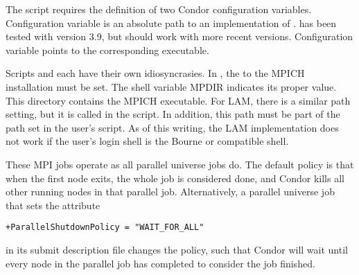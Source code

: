 The  script requires the definition of
two Condor configuration variables.
Configuration variable  is an absolute path to
an implementation of .
 has been tested with  version 3.9,
but should work with more recent versions.
Configuration variable  points
to the corresponding  executable.

Scripts  and 
each have their own idiosyncrasies.
In , the  to the MPICH installation must be set.
The shell variable MPDIR indicates its proper value.
This directory contains the MPICH  executable.
For LAM, there is a similar path setting, but it is called 
in the  script.  In addition, this path must be part of the
path set in the user's  script.
As of this writing, the LAM implementation does not work
if the user's login shell is the Bourne or compatible shell.

These MPI jobs operate as all parallel universe jobs do.
The default policy is that when the first node exits,
the whole job is considered done, 
and Condor kills all other running nodes in that parallel job.
Alternatively, a parallel universe job that sets the attribute
\begin{verbatim}
+ParallelShutdownPolicy = "WAIT_FOR_ALL"
\end{verbatim}
in its submit description file changes the policy,
such that Condor will wait until every node in the parallel 
job has completed to consider the job finished. 



